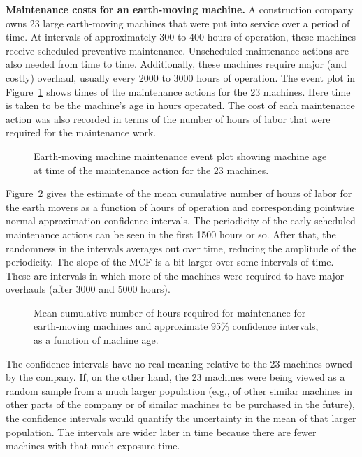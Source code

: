 \begin{example}
\label{example:hmachine.data}
{\bf Maintenance costs for an earth-moving machine.}
A construction company owns 23 large earth-moving machines that were
put into service over a period of time.  At intervals of
approximately 300 to 400 hours of operation, these machines receive
scheduled preventive maintenance. Unscheduled maintenance actions
are also needed from time to time.  Additionally, these machines
require major (and costly) overhaul, usually every 2000 to 3000 hours of
operation.  The event plot in
Figure~\ref{figure:hmachine.event.plot.ps} shows times of the
maintenance actions for the 23 machines.  Here time is taken to be
the machine's age in hours operated.  The cost of each maintenance
action was also recorded in terms of the number of hours of labor that were
required for the maintenance work.
\begin{figure} 
\caption{Earth-moving machine maintenance event plot showing machine
age at time of the maintenance action for the 23 machines.}
\label{figure:hmachine.event.plot.ps} 
\end{figure}
Figure~\ref{figure:hmachine.mcf.plot.ps} gives the estimate of
the mean cumulative
number of hours of labor for the earth movers as a function of hours
of operation and corresponding pointwise normal-approximation
confidence intervals. The periodicity of the early scheduled
maintenance actions can be seen in the first 1500 hours or so. After
that, the randomness in the intervals averages out over time,
reducing the amplitude of the periodicity. The slope of the MCF is a
bit larger over some intervals of time. These are intervals in which
more of the machines were required to have major overhauls (after
3000 and 5000 hours).
\begin{figure} 
\caption{Mean cumulative number of hours required for maintenance
for earth-moving machines and approximate 95\% confidence intervals,
as a function of machine age.}
\label{figure:hmachine.mcf.plot.ps} 
\end{figure}
The confidence intervals have no real meaning relative to the 23
machines owned by the company. If, on the other hand, the 23
machines were being viewed as a random sample from a much larger population
(e.g., of other similar machines in other parts of the company or of
similar machines to be purchased in the future), the confidence
intervals would quantify the uncertainty in the mean of that larger
population. The intervals are wider later in time because there
are fewer machines with that much exposure time.
\end{example}
